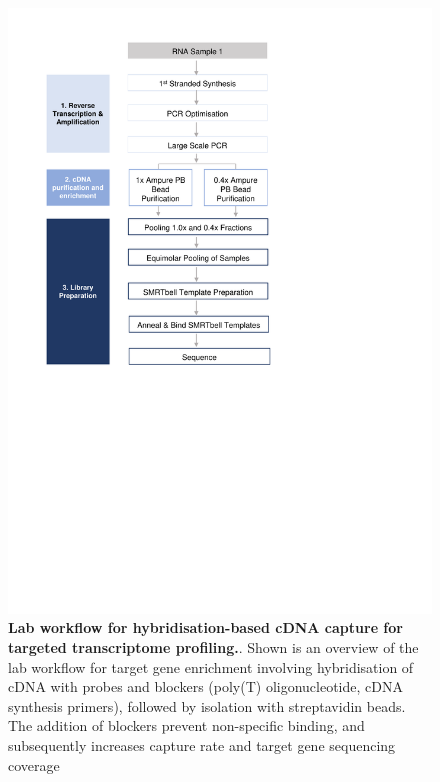 \begin{figure}[!h]
	\begin{center}
		\includegraphics[page=12,trim={0cm 6cm 0cm 1cm},clip,scale = 0.70]{Figures/ProjectDevelopment_Figures.pdf}
	\end{center}
	\captionsetup{width=0.95\textwidth}
	\caption[Lab workflow for hybridisation-based cDNA capture for targeted transcriptome profiling]%
	{\textbf{Lab workflow for hybridisation-based cDNA capture for targeted transcriptome profiling.}. Shown is an overview of the lab workflow for target gene enrichment involving hybridisation of cDNA with probes and blockers (poly(T) oligonucleotide, cDNA synthesis primers), followed by isolation with streptavidin beads. The addition of blockers prevent non-specific binding, and subsequently increases capture rate and target gene sequencing coverage}
	\label{fig:isoseq_targetcapture}
\end{figure}

